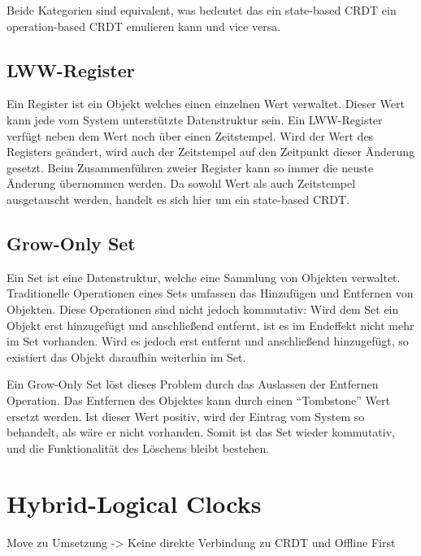 \documentclass[a4paper, 12pt]{scrreprt}
\begin{document}
Beide Kategorien sind equivalent\autocite[S. 9]{InproceedingsCRDTOriginal}, was bedeutet das ein state-based CRDT ein operation-based CRDT emulieren kann und vice versa.


\subsection{LWW-Register}
Ein Register ist ein Objekt welches einen einzelnen Wert verwaltet. Dieser Wert kann jede vom System unterstützte Datenstruktur sein. Ein \ac{LWW-Register} verfügt neben dem Wert noch über einen Zeitstempel. Wird der Wert des Registers geändert, wird auch der Zeitstempel auf den Zeitpunkt dieser Änderung gesetzt. Beim Zusammenführen zweier Register kann so immer die neuste Änderung übernommen werden. Da sowohl Wert als auch Zeitstempel ausgetauscht werden, handelt es sich hier um ein state-based CRDT.

\subsection{Grow-Only Set}
Ein Set ist eine Datenstruktur, welche eine Sammlung von Objekten verwaltet. Traditionelle Operationen eines Sets umfassen das Hinzufügen und Entfernen von Objekten. Diese Operationen sind nicht jedoch kommutativ: Wird dem Set ein Objekt erst hinzugefügt und anschließend entfernt, ist es im Endeffekt nicht mehr im Set vorhanden. Wird es jedoch erst entfernt und anschließend hinzugefügt, so existiert das Objekt daraufhin weiterhin im Set.

Ein Grow-Only Set löst dieses Problem durch das Auslassen der Entfernen Operation. Das Entfernen des Objektes kann durch einen \enquote{Tombstone} Wert ersetzt werden. Ist dieser Wert positiv, wird der Eintrag vom System so behandelt, als wäre er nicht vorhanden. Somit ist das Set wieder kommutativ, und die Funktionalität des Löschens bleibt bestehen. 


\section{Hybrid-Logical Clocks}
Move zu Umsetzung -> Keine direkte Verbindung zu CRDT und Offline First

\newpage
\printbibliography
\end{document}
